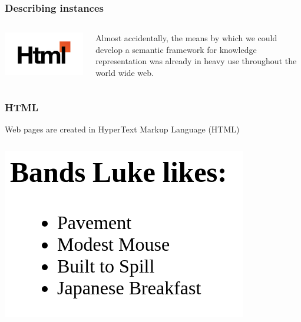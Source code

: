 \documentclass{beamer}
\begin{document}
\begin{frame}
\frametitle{Describing instances}

\begin{columns}

\includegraphics[width=\textwidth]{html.jpg}


Almost accidentally, the means by which we could develop a semantic
framework for knowledge representation was already in heavy use throughout the
world wide web.

\end{columns}
\end{frame}

\begin{frame}
\frametitle{HTML}
Web pages are created in HyperText Markup Language (HTML)
\begin{columns}





\includegraphics[width=\textwidth]{list.png}

\end{columns}
\end{frame}
\end{document}
